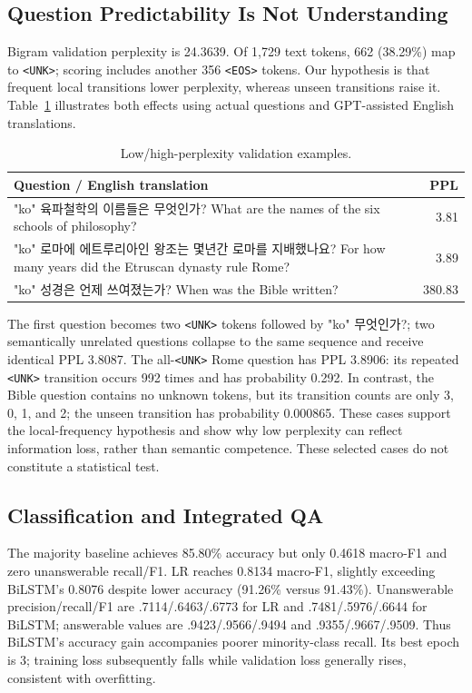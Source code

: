 \documentclass[11pt]{article}
\newcommand{\KO}[1]{{\koreanfont\XeTeXlinebreaklocale "ko" #1}}
\newcommand{\unk}{\texttt{<UNK>}}
\newcommand{\eos}{\texttt{<EOS>}}
\begin{document}
\subsection{Question Predictability Is Not Understanding}
Bigram validation perplexity is 24.3639. Of 1,729 text tokens, 662 (38.29\%) map to \unk{}; scoring includes another 356 \eos{} tokens. Our hypothesis is that frequent local transitions lower perplexity, whereas unseen transitions raise it. Table~\ref{tab:lm} illustrates both effects using actual questions and GPT-assisted English translations.

\begin{table}[t]
\small\centering
\begin{tabular}{p{}r}
\toprule
Question / English translation & PPL\\
\midrule
\KO{육파철학의 이름들은 무엇인가?}\newline
What are the names of the six schools of philosophy? & 3.81\\
\KO{로마에 에트루리아인 왕조는 몇년간 로마를 지배했나요?}\newline
For how many years did the Etruscan dynasty rule Rome? & 3.89\\
\KO{성경은 언제 쓰여졌는가?}\newline
When was the Bible written? & 380.83\\
\bottomrule
\end{tabular}
\caption{Low/high-perplexity validation examples.}
\label{tab:lm}
\end{table}

The first question becomes two \unk{} tokens followed by \KO{무엇인가?}; two semantically unrelated questions collapse to the same sequence and receive identical PPL 3.8087. The all-\unk{} Rome question has PPL 3.8906: its repeated \unk{} transition occurs 992 times and has probability 0.292. In contrast, the Bible question contains no unknown tokens, but its transition counts are only 3, 0, 1, and 2; the unseen transition has probability 0.000865. These cases support the local-frequency hypothesis and show why low perplexity can reflect information loss, rather than semantic competence. These selected cases do not constitute a statistical test.

\subsection{Classification and Integrated QA}
The majority baseline achieves 85.80\% accuracy but only 0.4618 macro-F1 and zero unanswerable recall/F1. LR reaches 0.8134 macro-F1, slightly exceeding BiLSTM's 0.8076 despite lower accuracy (91.26\% versus 91.43\%). Unanswerable precision/recall/F1 are .7114/.6463/.6773 for LR and .7481/.5976/.6644 for BiLSTM; answerable values are .9423/.9566/.9494 and .9355/.9667/.9509. Thus BiLSTM's accuracy gain accompanies poorer minority-class recall. Its best epoch is 3; training loss subsequently falls while validation loss generally rises, consistent with overfitting.
\end{document}
